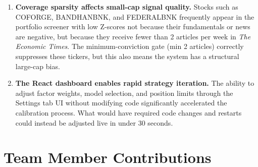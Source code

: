 \documentclass[12pt, a4paper]{article}
\begin{document}
\begin{enumerate}[leftmargin=2em, itemsep=4pt]
    \item \textbf{Coverage sparsity affects small-cap signal quality.} Stocks such as COFORGE, BANDHANBNK, and FEDERALBNK frequently appear in the portfolio screener with low Z-scores not because their fundamentals or news are negative, but because they receive fewer than 2 articles per week in \textit{The Economic Times}. The minimum-conviction gate (min 2 articles) correctly suppresses these tickers, but this also means the system has a structural large-cap bias.

    \item \textbf{The React dashboard enables rapid strategy iteration.} The ability to adjust factor weights, model selection, and position limits through the Settings tab UI without modifying code significantly accelerated the calibration process. What would have required code changes and restarts could instead be adjusted live in under 30 seconds.

\end{enumerate}

\section{Team Member Contributions}
\end{document}
